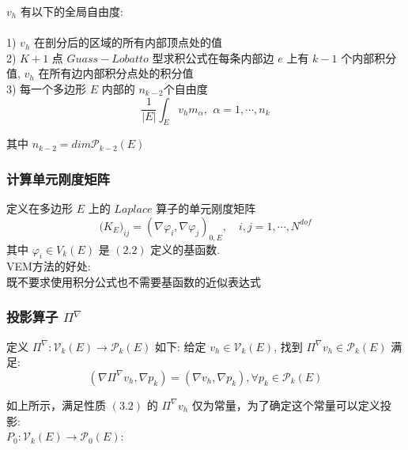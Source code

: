     $v_h$ 有以下的全局自由度: \\
    \\
    1) $v_h$ 在剖分后的区域的所有内部顶点处的值 \\
    2) $K + 1$ 点 $Guass-Lobatto$ 型求积公式在每条内部边 $e$ 上有 $k - 1$ 个内部积分值, $v_h$ 在所有边内部积分点处的积分值 \\  
    3) 每一个多边形 $E$ 内部的 $n_{k - 2}$个自由度\\
    \begin{equation}
    \frac{1}{|E|}\int_{E}v_hm_{\alpha},\,\ \alpha = 1,\cdots,n_k
    \end{equation}
    
    其中 $n_{k-2} = dim\mathcal{P}_{k - 2}(E)$\\
    
   \subsubsection{计算单元刚度矩阵}
  
    定义在多边形 $E$ 上的 $Laplace$ 算子的单元刚度矩阵\\
    \begin{equation}
    \mathbf(K_E)_{ij} = (\nabla\varphi_i, \nabla\varphi_j)_{0,E},\quad i,j = 1,\cdots,N^{dof}
    \end{equation}
    其中 $\varphi_i \in V_k(E)$ 是 $(2.2)$ 定义的基函数. \\
    
    VEM方法的好处:\\
    
    既不要求使用积分公式也不需要基函数的近似表达式\\
    
     \subsubsection{投影算子 $\Pi^{\nabla}$}
    
    定义 $\Pi^\nabla: \mathcal V_k(E)\rightarrow \mathcal{P}_k(E)$ 如下: 给定  $ v_h \in
    \mathcal V_k(E)$, 找到 $\Pi^\nabla v_h \in \mathcal{P}_k(E)$ 满足: \\
    \begin{equation}
    (\nabla \Pi^\nabla v_h, \nabla p_k) = (\nabla v_h, \nabla p_k), \forall p_k\in\mathcal{P}_k(E)
    \end{equation}
    
    如上所示，满足性质 $(3.2)$ 的 $\Pi^{\nabla}v_h$ 仅为常量，为了确定这个常量可以定义投影: \\
    $ P_0: \mathcal V_k(E) \rightarrow
    \mathcal{P}_0(E)$:
    
